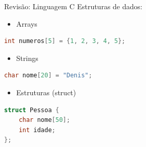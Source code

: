 \begin{frame}[fragile]{Revisão: Linguagem C}
    Estruturas de dados:

    \begin{itemize}
        \item Arrays
    \end{itemize}

\begin{lstlisting}[language=C,basicstyle=\ttfamily\scriptsize]
int numeros[5] = {1, 2, 3, 4, 5};
\end{lstlisting}

    \begin{itemize}
        \item Strings
    \end{itemize}

\begin{lstlisting}[language=C,basicstyle=\ttfamily\scriptsize]
char nome[20] = "Denis";
\end{lstlisting}

    \begin{itemize}
        \item Estruturas (struct)
    \end{itemize}

\begin{lstlisting}[language=C,basicstyle=\ttfamily\scriptsize]
struct Pessoa {
    char nome[50];
    int idade;
};
\end{lstlisting}

\end{frame}